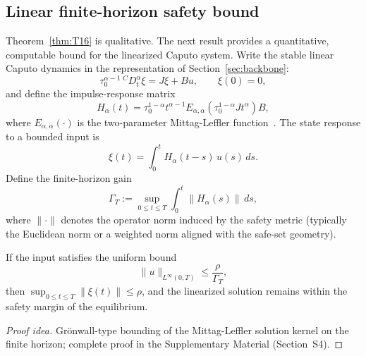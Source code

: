 \subsection{Linear finite-horizon safety bound}

Theorem~\ref{thm:T16} is qualitative. The next result provides a quantitative, computable bound for the linearized Caputo system. Write the stable linear Caputo dynamics in the representation of Section~\ref{sec:backbone}:
\begin{equation}
\tau_0^{\alpha-1}{\,}^C D_t^\alpha \xi = J \xi + B u,\qquad \xi(0) = 0,
\label{eq:linear_safety_system}
\end{equation}
and define the impulse-response matrix
\begin{equation}
H_\alpha(t) = \tau_0^{1-\alpha} t^{\alpha-1}
E_{\alpha, \alpha}\!\left(\tau_0^{1-\alpha} J t^\alpha\right) B,
\label{eq:impulse_Halpha}
\end{equation}
where \(E_{\alpha, \alpha}(\cdot)\) is the two-parameter Mittag-Leffler function~\cite{F08}. The state response to a bounded input is
\begin{equation}
\xi(t) = \int_0^t H_\alpha(t - s)\, u(s)\, ds.
\label{eq:state_conv}
\end{equation}
Define the finite-horizon gain
\begin{equation}
\Gamma_T := \sup_{0 \le t \le T} \int_0^t \|H_\alpha(s)\|\, ds,
\label{eq:GammaT}
\end{equation}
where \(\|\cdot\|\) denotes the operator norm induced by the safety metric (typically the Euclidean norm or a weighted norm aligned with the safe-set geometry).

\begin{lemma}
\label{lem:linear_safety}
If the input satisfies the uniform bound
\begin{equation}
\|u\|_{L^\infty(0, T)} \le \frac{\rho}{\Gamma_T},
\label{eq:safe_input_bound}
\end{equation}
then \(\sup_{0 \le t \le T} \|\xi(t)\| \le \rho\), and the linearized solution remains within the safety margin of the equilibrium.
\end{lemma}

\begin{proof}[Proof idea]
Gr\"onwall-type bounding of the Mittag-Leffler solution kernel on the finite horizon; complete proof in the Supplementary Material (Section~S4).
\end{proof}

